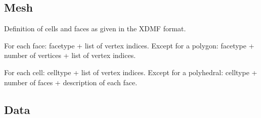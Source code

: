 \documentclass{article}
\begin{document}
\subsection{Mesh}

Definition of cells and faces as given in the XDMF format. 

For each face: facetype + list of vertex indices. Except for a polygon: facetype + number of vertices + list of vertex indices.

For each cell: celltype + list of vertex indices. Except for a polyhedral: celltype + number of faces + description of each face.




\subsection{Data}
\end{document}
